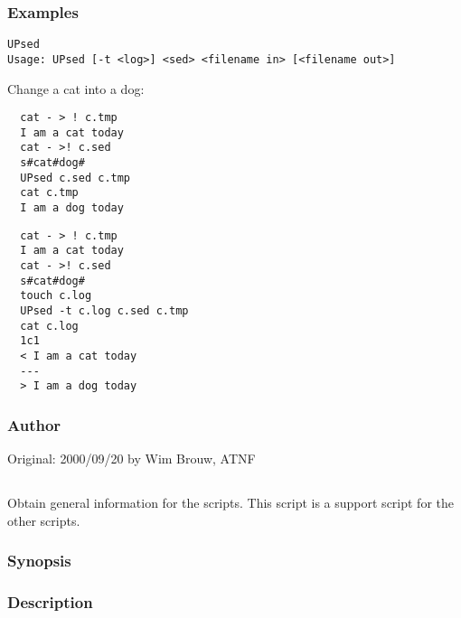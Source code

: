 \subsubsection*{Examples}

\begin{verbatim}
UPsed
Usage: UPsed [-t <log>] <sed> <filename in> [<filename out>]
\end{verbatim}

\noindent
Change a cat into a dog:

\begin{verbatim}
  cat - > ! c.tmp
  I am a cat today
  cat - >! c.sed
  s#cat#dog#
  UPsed c.sed c.tmp
  cat c.tmp
  I am a dog today
  \end{verbatim}

\begin{verbatim}
  cat - > ! c.tmp
  I am a cat today
  cat - >! c.sed
  s#cat#dog#
  touch c.log
  UPsed -t c.log c.sed c.tmp
  cat c.log
  1c1
  < I am a cat today
  ---
  > I am a dog today
\end{verbatim}

\subsubsection*{Author}

Original: 2000/09/20 by Wim Brouw, ATNF


\newpage

\subsection{}
\label{UPinfo}

Obtain general information for the  scripts. This script is a support
script for the other  scripts.


\subsubsection*{Synopsis}

\begin{synopsis}
\end{synopsis}

\subsubsection*{Description}


